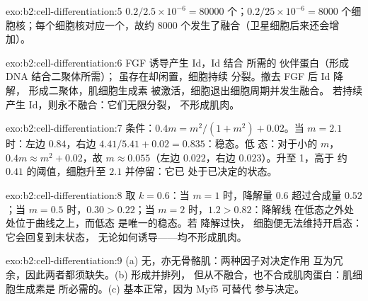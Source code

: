 \begin{solution}{exo:b2:cell-differentiation:5}
$0.2/2.5\times 10^{-6} = \num{80000}$ 个；$0.2/25\times 10^{-6}
= \num{8000}$ 个细胞核；每个细胞核对应一个，故约 \num{8000}
个发生了融合（卫星细胞后来还会增加）。
\end{solution}

\begin{solution}{exo:b2:cell-differentiation:6}
FGF 诱导产生 Id，Id 结合  所需的
伙伴蛋白（形成 DNA 结合二聚体所需）； 虽存在却闲置，细胞持续
分裂。撤去 FGF 后 Id 降解， 形成二聚体，肌细胞生成素
被激活，细胞退出细胞周期并发生融合。
若持续产生 Id，则永不融合：它们无限分裂，
不形成肌肉。
\end{solution}

\begin{solution}{exo:b2:cell-differentiation:7}
条件：$0.4m = m^{2}/(1 + m^{2}) + 0.02$。当 $m = 2.1$ 时：左边
$0.84$，右边 $4.41/5.41 + 0.02 = 0.835$：稳态。低
态：对于小的 $m$，$0.4m \approx m^{2} + 0.02$，故 $m \approx
0.055$（左边 $0.022$，右边 $0.023$）。升至 1，高于
约 $0.41$ 的阈值，细胞升至 $2.1$ 并停留：它已
处于已决定的状态。
\end{solution}

\begin{solution}{exo:b2:cell-differentiation:8}
取 $k = 0.6$：当 $m = 1$ 时，降解量 $0.6$ 超过合成量
$0.52$；当 $m = 0.5$ 时，$0.30 > 0.22$；当 $m = 2$ 时，$1.2 > 0.82$：降解线
在低态之外处处位于曲线之上，而低态
是唯一的稳态。若  降解过快，
细胞便无法维持开启态：它会回复到未状态，
无论如何诱导——均不形成肌肉。
\end{solution}

\begin{solution}{exo:b2:cell-differentiation:9}
(a) 无，亦无骨骼肌：两种因子对决定作用
互为冗余，因此两者都须缺失。(b) 形成并排列，
但从不融合，也不合成肌肉蛋白：肌细胞生成素是
所必需的。(c) 基本正常，因为 Myf5 可替代
 参与决定。
\end{solution}

